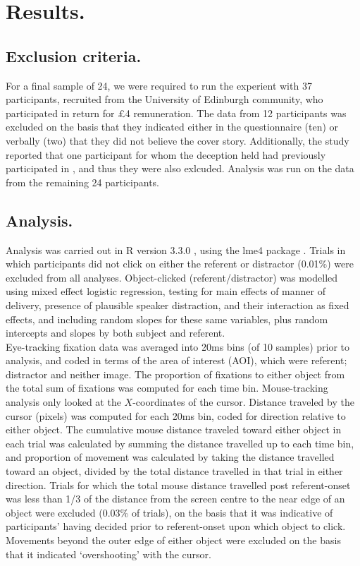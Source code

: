 \documentclass[a4paper,man,natbib]{apa6}
\begin{document}
\section{Results.}
\subsection{Exclusion criteria.}
For a final sample of 24, we were required to run the experient with 37 participants, recruited from the University of Edinburgh community, who participated in return for £4 remuneration. 
The data from 12 participants was excluded on the basis that they indicated either in the questionnaire (ten) or verbally (two) that they did not believe the cover story. 
Additionally, the study reported that one participant for whom the deception held had previously participated in \citet{Loy2016}, and thus they were also exlcuded. 
Analysis was run on the data from the remaining 24 participants.\\

\subsection{Analysis.}
Analysis was carried out in R version 3.3.0 \citep{rbase}, using the lme4 package \citep{lme4}. 
Trials in which participants did not click on either the referent or distractor (0.01\%) were excluded from all analyses. 
Object-clicked (referent/distractor) was modelled using mixed effect logistic regression, testing for main effects of manner of delivery, presence of plausible speaker distraction, and their interaction as fixed effects, and including random slopes for these same variables, plus random intercepts and slopes by both subject and referent. \\

Eye-tracking fixation data was averaged into 20ms bins (of 10 samples) prior to analysis, and coded in terms of the area of interest (AOI), which were referent; distractor and neither image. 
The proportion of fixations to either object from the total sum of fixations was computed for each time bin. 
Mouse-tracking analysis only looked at the $X$-coordinates of the cursor.
Distance traveled by the cursor (pixels) was computed for each 20ms bin, coded for direction relative to either object. 
The cumulative mouse distance traveled toward either object in each trial was calculated by summing the distance travelled up to each time bin, and proportion of movement was calculated by taking the distance travelled toward an object, divided by the total distance travelled in that trial in either direction. 
Trials for which the total mouse distance travelled post referent-onset was less than 1/3 of the distance from the screen centre to the near edge of an object were excluded (0.03\% of trials), on the basis that it was indicative of participants' having decided prior to referent-onset upon which object to click. 
Movements beyond the outer edge of either object were excluded on the basis that it indicated `overshooting' with the cursor.\\
\end{document}
